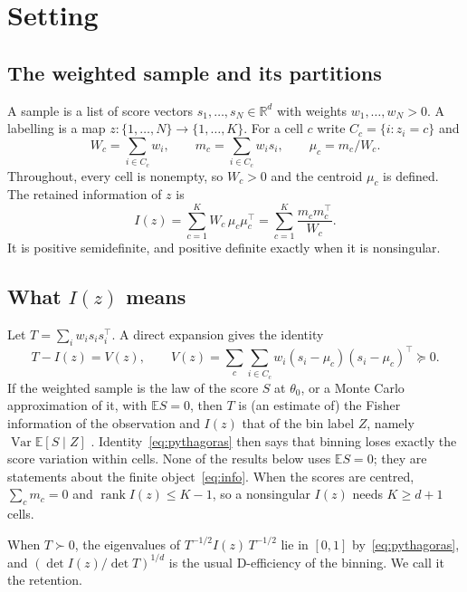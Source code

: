 \documentclass[11pt]{amsart}
\theoremstyle{definition}
\theoremstyle{remark}
\newcommand{\R}{\mathbb{R}}
\newcommand{\T}{^{\top}}
\newcommand{\Ib}{I(z)}
\begin{document}
\section{Setting}\label{sec:setting}

\subsection*{The weighted sample and its partitions}
A sample is a list of score vectors $s_1,\dots,s_N\in\R^d$ with weights $w_1,\dots,w_N>0$. A
labelling is a map $z:\{1,\dots,N\}\to\{1,\dots,K\}$. For a cell $c$ write $C_c=\{i:z_i=c\}$ and
\[
W_c=\sum_{i\in C_c}w_i,\qquad m_c=\sum_{i\in C_c}w_is_i,\qquad \mu_c=m_c/W_c .
\]
Throughout, every cell is nonempty, so $W_c>0$ and the centroid $\mu_c$ is defined. The
retained information of $z$ is
\begin{equation}\label{eq:info}
\Ib=\sum_{c=1}^K W_c\,\mu_c\mu_c\T=\sum_{c=1}^K \frac{m_cm_c\T}{W_c}.
\end{equation}
It is positive semidefinite, and positive definite exactly when it is nonsingular.

\subsection*{What $\Ib$ means}
Let $T=\sum_i w_is_is_i\T$. A direct expansion gives the identity
\begin{equation}\label{eq:pythagoras}
T-\Ib=V(z),\qquad V(z)=\sum_{c}\sum_{i\in C_c}w_i(s_i-\mu_c)(s_i-\mu_c)\T\succeq0 .
\end{equation}
If the weighted sample is the law of the score $S$ at $\theta_0$, or a Monte Carlo
approximation of it, with $\mathbb{E}S=0$, then $T$ is (an estimate of) the Fisher information of
the observation and $\Ib$ that of the bin label $Z$, namely $\operatorname{Var}\mathbb{E}[S\mid Z]$
\cite{venkitasubramaniam2006,barnes2018,barnes2020}. Identity~\eqref{eq:pythagoras} then says that
binning loses exactly the score variation within cells. None of the results below uses
$\mathbb{E}S=0$; they are statements about the finite object~\eqref{eq:info}. When the scores are
centred, $\sum_cm_c=0$ and $\operatorname{rank}\Ib\le K-1$, so a nonsingular $\Ib$ needs
$K\ge d+1$ cells.

When $T\succ0$, the eigenvalues of $T^{-1/2}\Ib\,T^{-1/2}$ lie in $[0,1]$
by~\eqref{eq:pythagoras}, and $(\det\Ib/\det T)^{1/d}$ is the usual D-efficiency of the binning.
We call it the retention.
\end{document}

